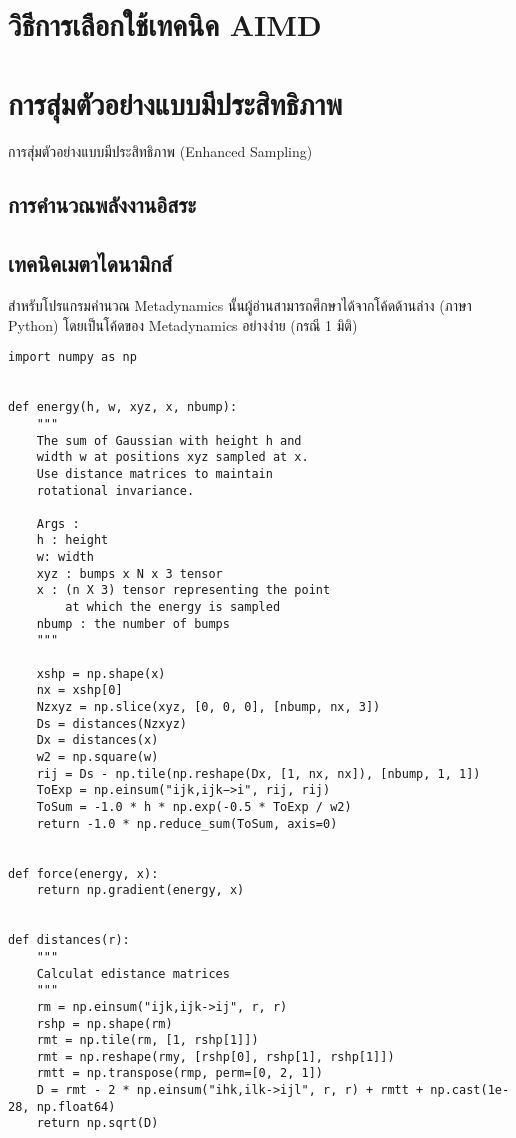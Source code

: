 \section{วิธีการเลือกใช้เทคนิค AIMD}

\section{การสุ่มตัวอย่างแบบมีประสิทธิภาพ}

การสุ่มตัวอย่างแบบมีประสิทธิภาพ (Enhanced Sampling)

\subsection{การคำนวณพลังงานอิสระ}

\subsection{เทคนิคเมตาไดนามิกส์}

สำหรับโปรแกรมคำนวณ Metadynamics นั้นผู้อ่านสามารถศึกษาได้จากโค้ดด้านล่าง (ภาษา Python) โดยเป็นโค้ดของ Metadynamics อย่างง่าย 
(กรณี 1 มิติ)

\begin{lstlisting}[style=MyPython]
import numpy as np


def energy(h, w, xyz, x, nbump):
    """
    The sum of Gaussian with height h and
    width w at positions xyz sampled at x.
    Use distance matrices to maintain
    rotational invariance.

    Args :
    h : height
    w: width
    xyz : bumps x N x 3 tensor
    x : (n X 3) tensor representing the point
        at which the energy is sampled
    nbump : the number of bumps
    """

    xshp = np.shape(x)
    nx = xshp[0]
    Nzxyz = np.slice(xyz, [0, 0, 0], [nbump, nx, 3])
    Ds = distances(Nzxyz)
    Dx = distances(x)
    w2 = np.square(w)
    rij = Ds - np.tile(np.reshape(Dx, [1, nx, nx]), [nbump, 1, 1])
    ToExp = np.einsum("ijk,ijk−>i", rij, rij)
    ToSum = -1.0 * h * np.exp(-0.5 * ToExp / w2)
    return -1.0 * np.reduce_sum(ToSum, axis=0)


def force(energy, x):
    return np.gradient(energy, x)


def distances(r):
    """
    Calculat edistance matrices
    """
    rm = np.einsum("ijk,ijk->ij", r, r)
    rshp = np.shape(rm)
    rmt = np.tile(rm, [1, rshp[1]])
    rmt = np.reshape(rmy, [rshp[0], rshp[1], rshp[1]])
    rmtt = np.transpose(rmp, perm=[0, 2, 1])
    D = rmt - 2 * np.einsum("ihk,ilk->ijl", r, r) + rmtt + np.cast(1e-28, np.float64)
    return np.sqrt(D)
\end{lstlisting}

